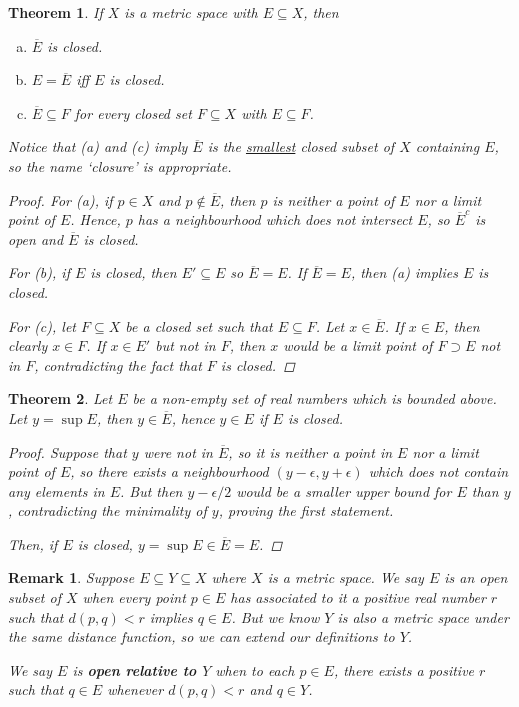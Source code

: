 \documentclass{scrbook}
\renewcommand{\underline}{\ul}
\newtheorem{theorem}{Theorem}
\newtheorem*{remark}{Remark}
\begin{document}
\begin{theorem}
If $X$ is a metric space with $E \subseteq X$, then
\begin{enumerate}[(a)]
\item $\overline{E}$ is closed.
\item $E = \overline{E}$ iff $E$ is closed.
\item $\overline{E} \subseteq F$ for every closed set $F \subseteq X$ with $E \subseteq F$.
\end{enumerate}
Notice that (a) and (c) imply $\overline{E}$ is the \underline{smallest} closed subset of $X$ containing $E$, so the name `closure' is appropriate.

\begin{proof}
For (a), if $p \in X$ and $p \not\in \overline{E}$, then $p$ is neither a point of $E$ nor a limit point of $E$. Hence, $p$ has a neighbourhood which does not intersect $E$, so $\overline{E}^c$ is open and $\overline{E}$ is closed.

For (b), if $E$ is closed, then $E' \subseteq E$ so $\overline{E} = E$. If $\overline{E} = E$, then (a) implies $E$ is closed.

For (c), let $F \subseteq X$ be a closed set such that $E \subseteq F$. Let $x \in \overline{E}$. If $x \in E$, then clearly $x \in F$. If $x \in E'$ but not in $F$, then $x$ would be a limit point of $F \supset E$ not in $F$, contradicting the fact that $F$ is closed.
\end{proof}
\end{theorem}

\begin{theorem}
Let $E$ be a non-empty set of real numbers which is bounded above. Let $y = \sup E$, then $y \in \overline{E}$, hence $y \in E$ if $E$ is closed.

\begin{proof}
Suppose that $y$ were not in $\overline{E}$, so it is neither a point in $E$ nor a limit point of $E$, so there exists a neighbourhood $(y - \epsilon, y + \epsilon)$ which does not contain any elements in $E$. But then $y - \epsilon/2$ would be a smaller upper bound for $E$ than $y$, contradicting the minimality of $y$, proving the first statement.

Then, if $E$ is closed, $y = \sup E \in \overline{E} = E$.
\end{proof}
\end{theorem}

\begin{remark}
Suppose $E \subseteq Y \subseteq X$ where $X$ is a metric space. We say $E$ is an open subset of $X$ when every point $p \in E$ has associated to it a positive real number $r$ such that $d(p, q) < r$ implies $q \in E$. But we know $Y$ is also a metric space under the same distance function, so we can extend our definitions to $Y$.

We say $E$ is \textbf{open relative to $Y$} when to each $p \in E$, there exists a positive $r$ such that $q \in E$ whenever $d(p, q) < r$ and $q \in Y$. 
\end{remark}
\end{document}

